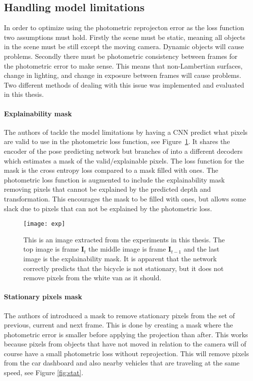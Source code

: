 \subsection{Handling model limitations}
\label{sec:modellimit}

In order to optimize using the photometric reprojecton error as the loss function two assumptions must hold. Firstly the scene must be static, meaning all objects in the scene must be still except the moving camera. Dynamic objects will cause problems. Secondly there must be photometric consistency between frames for the photometric error to make sense. This means that non-Lambertian surfaces, change in lighting, and change in exposure between frames will cause problems. Two different methods of dealing with this issue was implemented and evaluated in this thesis.

\paragraph{Explainability mask} The authors of \cite{sfmlearner} tackle the model limitations by having a CNN predict what pixels are valid to use in the photometric loss function, see Figure~\ref{fig:exp}. It shares the encoder of the pose predicting network but branches of into a different decoders which estimates a mask of the valid/explainable pixels. The loss function for the mask is the cross entropy loss compared to a mask filled with ones. The photometric loss function is augmented to include the explainability mask removing pixels that cannot be explained by the predicted depth and transformation. This encourages the mask to be filled with ones, but allows some slack due to pixels that can not be explained by the photometric loss.

\begin{figure}[H]
	\centering
	\texttt{[image: exp]}
	\caption{This is an image extracted from the experiments in this thesis. The top image is frame $\textbf{I}_t$ the middle image is frame $\textbf{I}_{t-1}$ and the last image is the explainability mask. It is apparent that the network correctly predicts that the bicycle is not stationary, but it does not remove pixels from the white van as it should.}
	\label{fig:exp}
\end{figure}

\paragraph{Stationary pixels mask} The authors of \cite{monodepth2} introduced a mask to remove stationary pixels from the set of previous, current and next frame. This is done by creating a mask where the photometric error is smaller before applying the projection than after. This works because pixels from objects that have not moved in relation to the camera will of course have a small photometric loss without reprojection. This will remove pixels from the car dashboard and also nearby vehicles that are traveling at the same speed, see Figure \ref{fig:stat}.

